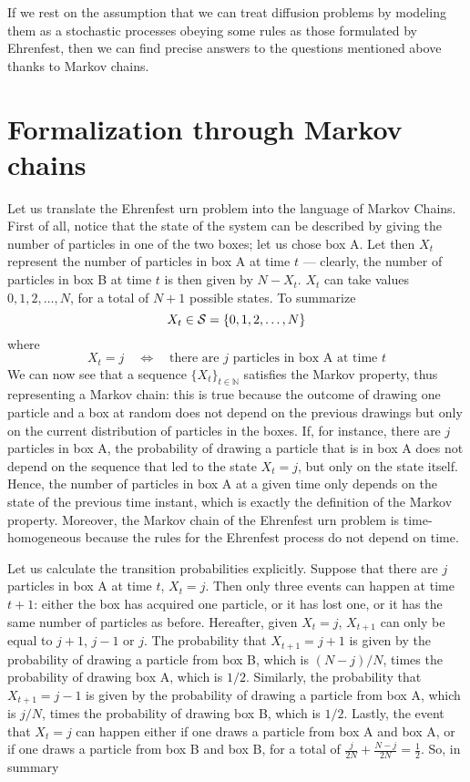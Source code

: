 If we rest on the assumption that we can treat diffusion problems by modeling them as a stochastic processes obeying some rules as those formulated by Ehrenfest, then we can find precise answers to the questions mentioned above thanks to Markov chains.

\section{Formalization through Markov chains}
Let us translate the Ehrenfest urn problem into the language of Markov Chains. 
First of all, notice that the state of the system can be described by giving the number of particles in one of the two boxes; let us chose box A. Let then $X_t$ represent the number of particles in box A at time $t$ --- clearly, the number of particles in box B at time $t$ is then given by $N - X_t$. $X_t$ can take values $0, 1, 2, \dots, N$, for a total of $N + 1$ possible states. To summarize
\begin{equation}
    X_t \in \mathcal{S} = \{ 0, 1, 2, \dots, N \}
\end{equation}
where
\begin{equation}
    X_t = j \quad \Leftrightarrow \quad \text{there are $j$ particles in box A at time $t$}
\end{equation}
We can now see that a sequence $\{X_t\}_{t\in \mathbb{N}}$ satisfies the Markov property, thus representing a Markov chain: this is true because the outcome of drawing one particle and a box at random does not depend on the previous drawings but only on the current distribution of particles in the boxes. If, for instance, there are $j$ particles in box A, the probability of drawing a particle that is in box A does not depend on the sequence that led to the state $X_t = j$, but only on the state itself. Hence, the number of particles in box A at a given time only depends on the state of the previous time instant, which is exactly the definition of the Markov property. Moreover, the Markov chain of the Ehrenfest urn problem is time-homogeneous because the rules for the Ehrenfest process do not depend on time.

Let us calculate the transition probabilities explicitly. Suppose that there are $j$ particles in box A at time $t$, \ie $X_t = j$. Then only three events can happen at time $t+1$: either the box has acquired one particle, or it has lost one, or it has the same number of particles as before. Hereafter, given $X_t = j$, $X_{t+1}$ can only be equal to $j+1$, $j-1$ or $j$. The probability that $X_{t+1} = j+1$ is given by the probability of drawing a particle from box B, which is $(N-j)/N$, times the probability of drawing box A, which is $1/2$. Similarly, the probability that $X_{t+1} = j - 1$ is given by the probability of drawing a particle from box A, which is $j/N$, times the probability of drawing box B, which is $1/2$. Lastly, the event that $X_t = j$ can happen either if one draws a particle from box A and box A, or if one draws a particle from box B and box B, for a total of $\frac{j}{2N} + \frac{N-j}{2N} = \frac{1}{2}$. So, in summary

